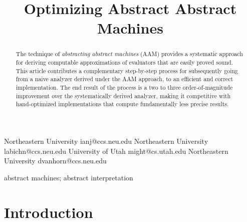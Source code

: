 \documentclass[9pt]{sigplanconf} %
\newcommand{\naive}{naive}
\begin{document}
\exclusivelicense

\setlength{\pdfpageheight}{\paperheight}
\setlength{\pdfpagewidth}{\paperwidth}



\title{Optimizing Abstract Abstract Machines}

           {Northeastern University}
           {ianj@ccs.neu.edu}
           {Northeastern University}
           {labichn@ccs.neu.edu}
           {University of Utah}
           {might@cs.utah.edu}
           {Northeastern University}
           {dvanhorn@ccs.neu.edu}
\maketitle

\begin{abstract}
The technique of \emph{abstracting abstract machines} (AAM) provides a systematic approach for deriving computable approximations of evaluators that are easily proved sound.
%
This article contributes a complementary step-by-step process for subsequently going from a \naive{} analyzer derived under the AAM approach, to an efficient and correct implementation.
%
The end result of the process is a two to three order-of-magnitude improvement over the systematically derived analyzer, making it competitive with hand-optimized implementations that compute fundamentally less precise results.
\end{abstract}



\keywords
abstract machines; abstract interpretation

\section{Introduction}
\end{document}
